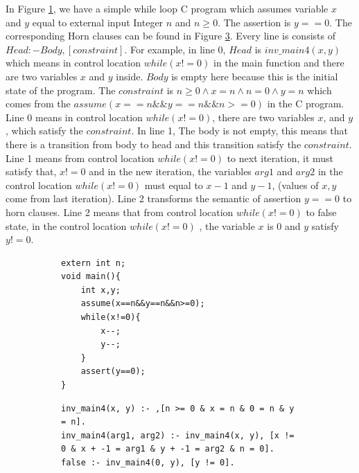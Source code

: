 \documentclass{article}
\begin{document}
In Figure \ref{while-C-program}, we have a simple while loop C program which assumes variable $x$ and $y$ equal to external input Integer $n$ and $n\geq 0$. The assertion is $y==0$. The corresponding Horn clauses can be found in  Figure \ref{while-C-horn-clauses}. Every line is consists of $Head:-Body,[constraint]$. For example, in line 0, $Head$ is $inv\_main4(x, y)$ which means in control location $while(x!=0)$ in the main function and there are two variables $x$ and $y$ inside. $Body$ is empty here because this is the initial state of the program. The $constraint$ is $n \geq 0 \wedge x = n \wedge n = 0 \wedge y = n$ which comes from the $assume(x==n\&\&y==n\&\&n>=0)$ in the C program. Line 0 means in control location $while(x!=0)$, there are two variables $x$, and $y$, which satisfy the $constraint$. In line 1, The body is not empty, this means that there is a transition from body to head and this transition satisfy the $constraint$. Line 1 means from control location $while(x!=0)$ to next iteration, it must satisfy that, $x!=0$ and in the new iteration, the variables $arg1$ and $arg2$ in the control location $while(x!=0)$ must equal to $x-1$ and $y-1$, (values of $x,y$ come from last iteration). Line 2 transforms the semantic of assertion $y==0$ to horn clauses. Line 2 means that from control  location $while(x!=0)$ to false state, in the control location $while(x!=0)$ , the variable $x$ is 0 and $y$ satisfy $y!=0$.


\begin{figure}[h]
\begin{subfigure}[b]{0.4\textwidth}
\begin{lstlisting}
extern int n;
void main(){
    int x,y;
    assume(x==n&&y==n&&n>=0);
    while(x!=0){
        x--;
        y--;
    }
    assert(y==0);
}
\end{lstlisting}\label{while-C-program}
\end{subfigure}
\begin{subfigure}[b]{0.6\textwidth}
\begin{lstlisting}
inv_main4(x, y) :- ,[n >= 0 & x = n & 0 = n & y = n].
inv_main4(arg1, arg2) :- inv_main4(x, y), [x != 0 & x + -1 = arg1 & y + -1 = arg2 & n = 0].
false :- inv_main4(0, y), [y != 0].
\end{lstlisting}\label{while-C-horn-clauses}
  \end{subfigure}
  \caption{}
\end{figure}
\end{document}
